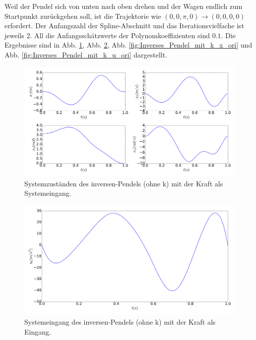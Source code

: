 \begin{beispiel}
	Weil der Pendel sich von unten nach oben drehen und der Wagen endlich zum Startpunkt zurückgehen soll, ist die Trajektorie wie $\left ( 0,0,\pi ,0 \right )\rightarrow \left ( 0,0,0,0 \right )$ erfordert. Der Anfangszahl der Spline-Abschnitt und das Iterationsvielfache ist jeweils $2$. All die Anfangsschätzwerte der Polynomkoeffizienten sind $0.1$. Die Ergebnisse sind in Abb. \ref{fig:Inverses_Pendel_ohne_k_x}, Abb. \ref{fig:Inverses_Pendel_ohne_k_u}, Abb. \ref{fig:Inverses_Pendel_mit_k_x_ori} und Abb. \ref{fig:Inverses_Pendel_mit_k_u_ori} dargestellt.
	
	\begin{figure}
		\centering
		\includegraphics[width=15.5cm]{bild/30_32/example0_ohne_k_x.pdf}
		\caption{Systemzuständen des inversen-Pendels (ohne k) mit der Kraft als Systemeingang.}
		\label{fig:Inverses_Pendel_ohne_k_x}
	\end{figure}

	\begin{figure}
		\centering
		\includegraphics[width=12cm]{bild/30_32/example0_ohne_k_u.pdf}
		\caption{Systemeingang des inversen-Pendels (ohne k) mit der Kraft als Eingang.}
		\label{fig:Inverses_Pendel_ohne_k_u}
	\end{figure}


\end{beispiel}
